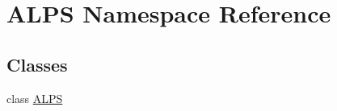 \hypertarget{namespaceALPS}{\section{A\-L\-P\-S Namespace Reference}
\label{namespaceALPS}
}
\subsection*{Classes}
\begin{DoxyCompactItemize}
\item 
class \hyperlink{classALPS_1_1ALPS}{A\-L\-P\-S}
\end{DoxyCompactItemize}

